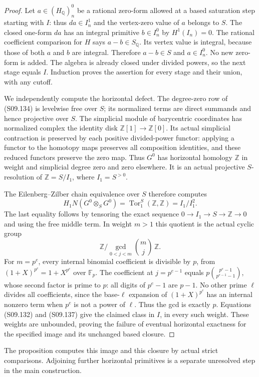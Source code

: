 \begin{proof}
Let $a\in(H_{\mathbb Q})_n^0$ be a rational zero-form
allowed at a based saturation step starting with $I$:
thus $da\in I_n^1$
and the vertex-zero value of $a$ belongs to $S$.
The closed one-form $da$ has an integral primitive
$b\in I_n^0$ by $H^1(I_n)=0$.
The rational coefficient comparison for $H$ says
$a-b\in S_{\mathbb Q}$.  Its vertex value is integral,
because those of both $a$ and $b$ are integral.
Therefore $a-b\in S$ and $a\in I_n^0$.
No new zero-form is added.  The algebra is already
closed under divided powers, so the next stage equals
$I$.  Induction proves the assertion for every stage
and their union, with any cutoff.

We independently compute the horizontal defect.
The degree-zero row of (S09.134) is levelwise free
over $S$; its normalized terms are direct summands
and hence projective over $S$.
The simplicial module of barycentric coordinates has
normalized complex the identity disk
$\mathbb Z[1]\to\mathbb Z[0]$.
Its actual simplicial contraction is preserved by
each positive divided-power functor: applying a functor
to the homotopy maps preserves all composition identities,
and these reduced functors preserve the zero map.
Thus $G^0$ has horizontal homology $\mathbb Z$ in
weight and simplicial degree zero and zero elsewhere.
It is an actual projective $S$-resolution of
$\mathbb Z=S/I_1$, where $I_1=S^{>0}$.

The Eilenberg--Zilber chain equivalence over $S$
therefore computes
\[
 H_1N(G^0\otimes_SG^0)
    =\operatorname{Tor}_1^S(\mathbb Z,\mathbb Z)
    =I_1/I_1^2.
 \tag{S09.137}
\]
The last equality follows by tensoring the exact
sequence $0\to I_1\to S\to\mathbb Z\to0$ and using
the free middle term.  In weight $m>1$ this quotient
is the actual cyclic group
\[
 \mathbb Z\Big/
       \gcd_{0<j<m}\binom mj\,\mathbb Z.
 \tag{S09.138}
\]
For $m=p^e$, every internal binomial coefficient is
divisible by $p$, from $(1+X)^{p^e}=1+X^{p^e}$
over $\mathbb F_p$.  The coefficient at $j=p^{e-1}$
equals $p\binom{p^e-1}{p^{e-1}-1}$, whose second
factor is prime to $p$: all digits of $p^e-1$ are
$p-1$.  No other prime $\ell$ divides all coefficients,
since the base-$\ell$ expansion of $(1+X)^{p^e}$ has
an internal nonzero term when $p^e$ is not a power
of $\ell$.  Thus the gcd is exactly $p$.
Equations (S09.132) and (S09.137) give the claimed
class in $I$, in every such weight.
These weights are unbounded, proving the failure of
eventual horizontal exactness for the specified image
and its unchanged based closure.
\end{proof}

The proposition computes this image and this closure
by actual strict comparisons.  Adjoining further
horizontal primitives is a separate unresolved step
in the main construction.
